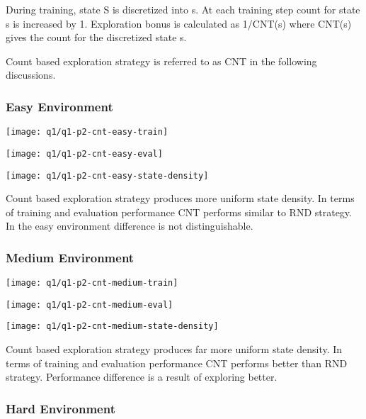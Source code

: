 \documentclass[11pt]{article}
\begin{document}
    During training, state S is discretized into s.
    At each training step count for state s is increased by 1.
    Exploration bonus is calculated as 1/CNT(s) where CNT(s) gives the count for the discretized state s.

    Count based exploration strategy is referred to as CNT in the following discussions.

    \subsubsection*{Easy Environment}

    \hspace*{-0.6in}
    \texttt{[image: q1/q1-p2-cnt-easy-train]}

    \hspace*{-0.6in}
    \texttt{[image: q1/q1-p2-cnt-easy-eval]}

    \hspace*{-0.6in}
    \texttt{[image: q1/q1-p2-cnt-easy-state-density]}

    Count based exploration strategy produces more uniform state density.
    In terms of training and evaluation performance CNT performs similar to RND strategy.
    In the easy environment difference is not distinguishable.

    \subsubsection*{Medium Environment}

    \hspace*{-0.6in}
    \texttt{[image: q1/q1-p2-cnt-medium-train]}

    \hspace*{-0.6in}
    \texttt{[image: q1/q1-p2-cnt-medium-eval]}

    \hspace*{-0.6in}
    \texttt{[image: q1/q1-p2-cnt-medium-state-density]}

    Count based exploration strategy produces far more uniform state density.
    In terms of training and evaluation performance CNT performs better than RND strategy.
    Performance difference is a result of exploring better.


    \subsubsection*{Hard Environment}
\end{document}
